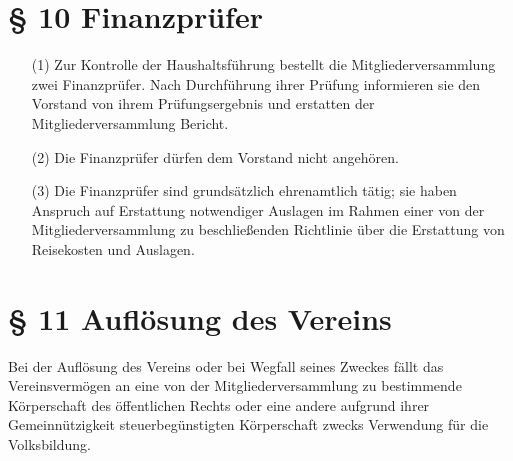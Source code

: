 \documentclass[12pt,paper=a4,ngerman]{scrreprt}
\begin{document}
\section{\S{} 10 Finanzprüfer}

\begin{itemize}
\item[(1)]
Zur Kontrolle der Haushaltsführung bestellt die Mitgliederversammlung
zwei Finanzprüfer. Nach Durchführung ihrer Prüfung informieren sie den
Vorstand von ihrem Prüfungsergebnis und erstatten der
Mitgliederversammlung Bericht.
\item[(2)]
Die Finanzprüfer dürfen dem Vorstand nicht angehören.
\item[(3)]
Die Finanzprüfer sind grundsätzlich ehrenamtlich tätig; sie haben
Anspruch auf Erstattung notwendiger Auslagen im Rahmen einer von der
Mitgliederversammlung zu beschließenden Richtlinie über die Erstattung
von Reisekosten und Auslagen.
\end{itemize}

\section{\S{} 11 Auflösung des Vereins}
Bei der Auflösung des Vereins oder bei Wegfall seines Zweckes fällt
das Vereinsvermögen an eine von der Mitgliederversammlung zu
bestimmende Körperschaft des öffentlichen Rechts oder eine andere
aufgrund ihrer Gemeinnützigkeit steuerbegünstigten Körperschaft zwecks
Verwendung für die Volksbildung.
\end{document}
